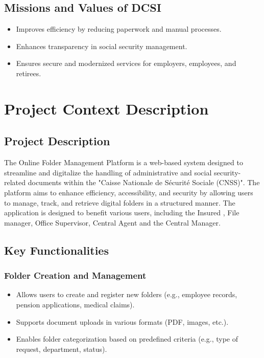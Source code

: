 \subsection{ Missions and Values of DCSI} 
\begin{itemize}
    \item Improves efficiency by reducing paperwork and manual processes.
    \item Enhances transparency in social security management.
    \item Ensures secure and modernized services for employers, employees, and retirees.
\end{itemize}

\section{Project Context Description}
\subsection{Project Description}
The Online Folder Management Platform is a web-based system designed to streamline and digitalize the handling of administrative and social security-related documents within the "Caisse Nationale de Sécurité Sociale (CNSS)". The platform aims to enhance efficiency, accessibility, and security by allowing users to manage, track, and retrieve digital folders in a structured manner.
The application is designed to benefit various users, including the Insured , File manager, Office Supervisor, Central Agent and the Central Manager. 

\subsection{Key Functionalities}
\subsubsection{ Folder Creation and Management}
\begin{itemize}
    \item Allows users to create and register new folders (e.g., employee records, pension applications, medical claims).
    \item Supports document uploads in various formats (PDF, images, etc.).
    \item Enables folder categorization based on predefined criteria (e.g., type of request, department, status).
\end{itemize}

